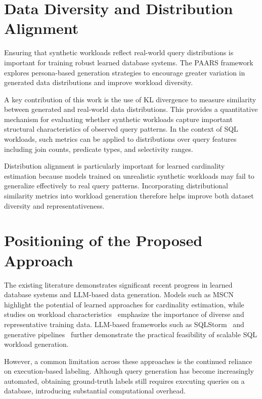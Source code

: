 \section{Data Diversity and Distribution Alignment}

Ensuring that synthetic workloads reflect real-world query distributions is important for training robust learned database systems. The PAARS framework~\cite{DBLP:journals/corr/abs-2503-24228} explores persona-based generation strategies to encourage greater variation in generated data distributions and improve workload diversity.

A key contribution of this work is the use of KL divergence to measure similarity between generated and real-world data distributions. This provides a quantitative mechanism for evaluating whether synthetic workloads capture important structural characteristics of observed query patterns. In the context of SQL workloads, such metrics can be applied to distributions over query features including join counts, predicate types, and selectivity ranges.

Distribution alignment is particularly important for learned cardinality estimation because models trained on unrealistic synthetic workloads may fail to generalize effectively to real query patterns. Incorporating distributional similarity metrics into workload generation therefore helps improve both dataset diversity and representativeness.

\section{Positioning of the Proposed Approach}

The existing literature demonstrates significant recent progress in learned database systems and LLM-based data generation. Models such as MSCN~\cite{DBLP:conf/cidr/KipfKRLBK19} highlight the potential of learned approaches for cardinality estimation, while studies on workload characteristics~\cite{DBLP:journals/pvldb/WangQWWZ21} emphasize the importance of diverse and representative training data. LLM-based frameworks such as SQLStorm~\cite{DBLP:journals/pvldb/SchmidtLBN25} and generative pipelines~\cite{DBLP:journals/corr/abs-2512-20271} further demonstrate the practical feasibility of scalable SQL workload generation.

However, a common limitation across these approaches is the continued reliance on execution-based labeling. Although query generation has become increasingly automated, obtaining ground-truth labels still requires executing queries on a database, introducing substantial computational overhead.

